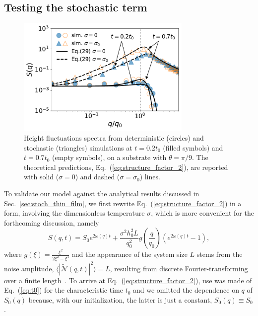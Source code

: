 \subsection{Testing the stochastic term}\label{subsec:validation}
\begin{figure}
    \centering
    \includegraphics[width=0.75\textwidth]{graphics/spectrum_theta_20_nob_fill_pattern.pdf}
    \caption{Height fluctuations spectra from deterministic (circles) and stochastic (triangles) simulations at $t=0.2 t_0$ (filled symbols) and $t=0.7 t_0$ (empty symbols), on a substrate with $\theta =\pi/9$. 
    The theoretical predictions, Eq.~(\ref{eq:structure_factor_2}), are reported with solid ($\sigma=0$) and dashed ($\sigma = \sigma_0$) lines.}
    \label{fig:theory_simulation_structure_factor}
\end{figure}
To validate our model against the analytical results discussed in Sec.~\ref{sec:stoch_thin_film}, we first rewrite Eq.~(\ref{eq:structure_factor_2}) in a form, involving the dimensionless temperature $\sigma$, which is more convenient for the forthcoming discussion, namely
\begin{equation}\label{eq:structure_factor_2}
    S(q,t) = S_0 e^{2\omega(q)t} + \frac{\sigma^2 h_0^2 L}{q_0^2}g\left(\frac{q}{q_0}\right)(e^{2\omega(q)t} - 1),
\end{equation}
where $g(\xi) = \frac{\xi^2}{2\xi^2 - \xi^4}$ and the appearance of the system size $L$ stems from the noise amplitude, $\langle |\tilde{\mathcal{N}}(q,t)|^2 \rangle = L$, resulting from discrete Fourier-transforming over a finite length~\cite{zhangMolecularSimulationThin2019,zhangNanoscaleThinfilmFlows2020}. 
To arrive at Eq.~(\ref{eq:structure_factor_2}), use was made of Eq.~(\ref{eq:t0}) for the characteristic time $t_0$ and we omitted the dependence on $q$ of $S_0(q)$ because, with our initialization, the latter is just a constant, $S_0(q)\equiv S_0$.
